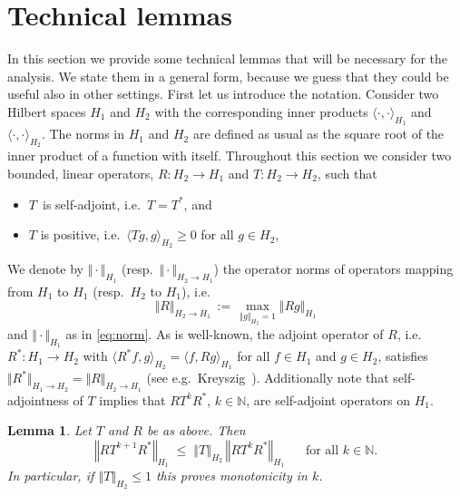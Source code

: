 \documentclass{dis}
\newtheorem{lemma}[theorem]{Lemma}
\theoremstyle{citing}
\begin{document}
\vspace{2mm}

\section{Technical lemmas} \label{sec:4_technical}

In this section we provide some technical lemmas that will be 
necessary for the analysis. We state them in a general form, 
because we guess that they could be useful also in other settings.
First let us introduce the notation. 
Consider two Hilbert spaces $H_1$ and $H_2$ with the corresponding 
inner products ${\langle}\cdot,\cdot{\rangle}_{H_1}$ and ${\langle}\cdot,\cdot{\rangle}_{H_2}$. 
The norms in ${H_1}$ and ${H_2}$ are defined as usual as the square 
root of the inner product of a function with itself. 
Throughout this section we consider two bounded, 
linear operators, $R: {H_2}\to {H_1}$ and $T: {H_2}\to {H_2}$, 
such that 
\begin{itemize}
	\item $T$\  is self-adjoint, i.e.~$T=T^*$, and \vspace{1mm}
	\item $T$ is positive, i.e.~${\langle} Tg,g{\rangle}_{H_2}\ge0$ for all $g\in {H_2}$, 
\end{itemize}
We denote by $\Vert \cdot\Vert_{H_1}$ 
(resp.~$\Vert \cdot\Vert_{{H_2}\to {H_1}}$) the operator norms of 
operators mapping from ${H_1}$ to ${H_1}$ (resp.~${H_2}$ to ${H_1}$), 
i.e.
\[
\Vert R\Vert_{{H_2}\to {H_1}} \,:=\, 
	\max_{\Vert g\Vert_{H_2}=1} \Vert Rg\Vert_{H_1}
\]
and $\Vert \cdot\Vert_{H_1}$ as in \eqref{eq:norm}.
As is well-known, the adjoint operator of $R$, 
i.e.~$R^*: {H_1}\to {H_2}$ with ${\langle} R^*f,g{\rangle}_{H_2}={\langle} f,R g{\rangle}_{H_1}$ 
for all $f\in {H_1}$ and $g\in {H_2}$, satisfies 
$\Vert R^*\Vert_{{H_1}\to {H_2}}=\Vert R\Vert_{{H_2}\to {H_1}}$  
(see e.g.~Kreyszig~\cite[Thm.~3.9-2]{Krey}).
Additionally note that self-adjointness of $T$ implies that 
$R T^k R^*$, $k\in{\ensuremath{\mathbb{N}}}$, are self-adjoint operators 
on $H_1$.

\begin{lemma} \label{lemma:tech_mon}
Let $T$ and $R$ be as above. Then
\[
{\left\Vert {R T^{k+1} R^*} \right\Vert}_{{H_1}} \;\le\; {\left\Vert {T} \right\Vert}_{{H_2}}\,{\left\Vert {R T^k R^*} \right\Vert}_{{H_1}}
\; \quad \text{ for all } k\in{\ensuremath{\mathbb{N}}}.
\]
In particular, if ${\left\Vert {T} \right\Vert}_{{H_2}}\le1$ this proves monotonicity in $k$.
\end{lemma}
\end{document}
